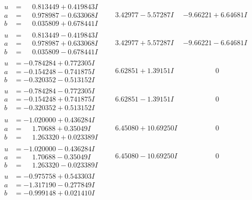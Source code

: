 \documentclass[1p]{elsarticle_modified}
\theoremstyle{definition}
\begin{document}
$$\begin{array}{c|c|c}
\begin{aligned}
u &= \phantom{-}0.813449 + 0.419843 I \\
a &= \phantom{-}0.978987 - 0.633068 I \\
b &= \phantom{-}0.035809 + 0.678441 I\end{aligned}
 & \phantom{-}3.42977 - 5.57287 I & -9.66221 + 6.64681 I \\ \hline\begin{aligned}
u &= \phantom{-}0.813449 - 0.419843 I \\
a &= \phantom{-}0.978987 + 0.633068 I \\
b &= \phantom{-}0.035809 - 0.678441 I\end{aligned}
 & \phantom{-}3.42977 + 5.57287 I & -9.66221 - 6.64681 I \\ \hline\begin{aligned}
u &= -0.784284 + 0.772305 I \\
a &= -0.154248 - 0.741875 I \\
b &= -0.320352 - 0.513152 I\end{aligned}
 & \phantom{-}6.62851 + 1.39151 I & \phantom{-0.000000 } 0 \\ \hline\begin{aligned}
u &= -0.784284 - 0.772305 I \\
a &= -0.154248 + 0.741875 I \\
b &= -0.320352 + 0.513152 I\end{aligned}
 & \phantom{-}6.62851 - 1.39151 I & \phantom{-0.000000 } 0 \\ \hline\begin{aligned}
u &= -1.020000 + 0.436284 I \\
a &= \phantom{-}1.70688 + 0.35049 I \\
b &= \phantom{-}1.263320 + 0.023389 I\end{aligned}
 & \phantom{-}6.45080 + 10.69250 I & \phantom{-0.000000 } 0 \\ \hline\begin{aligned}
u &= -1.020000 - 0.436284 I \\
a &= \phantom{-}1.70688 - 0.35049 I \\
b &= \phantom{-}1.263320 - 0.023389 I\end{aligned}
 & \phantom{-}6.45080 - 10.69250 I & \phantom{-0.000000 } 0 \\ \hline\begin{aligned}
u &= -0.975758 + 0.543303 I \\
a &= -1.317190 - 0.277849 I \\
b &= -0.999148 + 0.021410 I\end{aligned}

\end{array}$$
\end{document}
